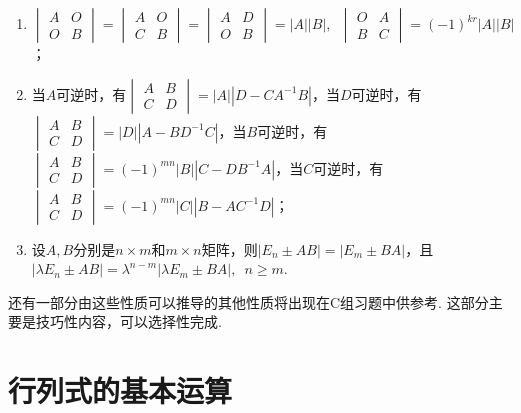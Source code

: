 \begin{enumerate}
    \item $\begin{vmatrix}
                  A & O \\ O & B
              \end{vmatrix} = \begin{vmatrix}
                  A & O \\ C & B
              \end{vmatrix} = \begin{vmatrix}
                  A & D \\ O & B
              \end{vmatrix} = |A||B|,\enspace\begin{vmatrix}
                  O & A \\ B & C
              \end{vmatrix} = (-1)^{kr}|A||B|$；

    \item 当$A$可逆时，有$\begin{vmatrix}
                  A & B \\ C & D
              \end{vmatrix} = |A||D-CA^{-1}B|$，当$D$可逆时，有$\begin{vmatrix}
                  A & B \\ C & D
              \end{vmatrix} = |D||A-BD^{-1}C|$，当$B$可逆时，有$\begin{vmatrix}
                  A & B \\ C & D
              \end{vmatrix} = (-1)^{mn}|B||C-DB^{-1}A|$，当$C$可逆时，有$\begin{vmatrix}
                  A & B \\ C & D
              \end{vmatrix} = (-1)^{mn}|C||B-AC^{-1}D|$；

    \item 设$A,B$分别是$n \times m$和$m \times n$矩阵，则$|E_n \pm AB|=|E_m \pm BA|$，且 \\
          $|\lambda E_n \pm AB|=\lambda^{n-m}|\lambda E_m \pm BA|,\enspace n \geqslant m$.
\end{enumerate}

还有一部分由这些性质可以推导的其他性质将出现在C组习题中供参考. 这部分主要是技巧性内容，可以选择性完成.

\section{行列式的基本运算}

